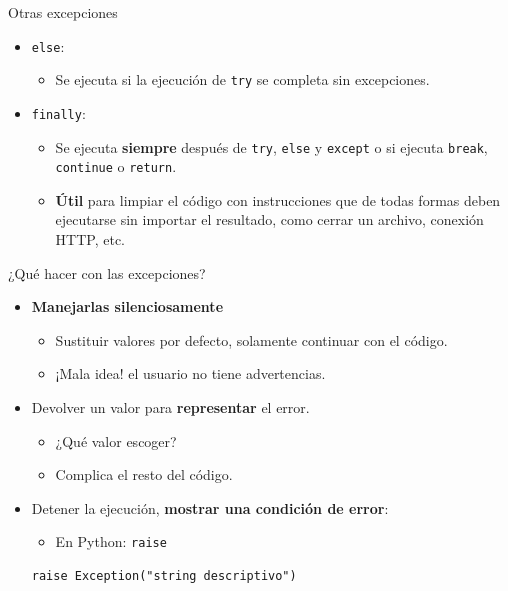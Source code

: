 \documentclass[mathserif]{beamer}
\begin{document}
\begin{frame}[fragile]{Otras excepciones}
    \begin{itemize}
        \item \lstinline|else|:
        \begin{itemize}
            \item Se ejecuta si la ejecución de \lstinline|try| {\orange se completa sin excepciones}.
        \end{itemize}
        
        \item \lstinline|finally|:
        \begin{itemize}
            \item Se ejecuta {\orange\bfseries siempre} después de \lstinline|try|, \lstinline|else| y \lstinline|except| o si ejecuta \lstinline|break|, \lstinline|continue| o \lstinline|return|.
            
            \item {\orange\bfseries Útil} para limpiar el código con instrucciones que de todas formas deben ejecutarse sin importar el resultado, como cerrar un archivo, conexión HTTP, etc.
        \end{itemize}
    \end{itemize}
\end{frame}

\begin{frame}[fragile]{¿Qué hacer con las excepciones?}
    \begin{itemize}
        \item {\blue\bfseries Manejarlas silenciosamente}
        \begin{itemize}
            \item Sustituir valores por defecto, solamente continuar con el código.
            \item ¡Mala idea! el usuario no tiene advertencias.
        \end{itemize}
        
        \item Devolver un valor para {\blue\bfseries representar} el error. 
        \begin{itemize}
            \item ¿Qué valor escoger?
            \item Complica el resto del código.
        \end{itemize}
        
        \item Detener la ejecución, {\orange\bfseries mostrar una condición de error}:
        \begin{itemize}
            \item En Python: \lstinline|raise|
        \end{itemize}
\begin{lstlisting}
raise Exception("string descriptivo")
\end{lstlisting}
    \end{itemize}
\end{frame}
\end{document}
